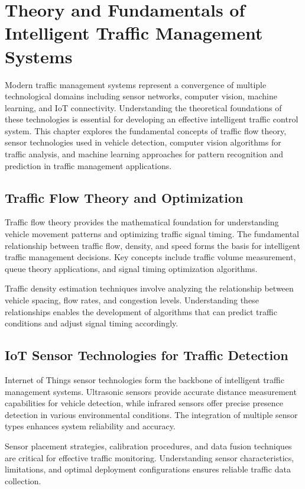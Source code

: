 \documentclass[12pt]{report}
\begin{document}
\chapter{Theory and Fundamentals of Intelligent Traffic Management Systems}
Modern traffic management systems represent a convergence of multiple technological domains including sensor networks, computer vision, machine learning, and IoT connectivity. Understanding the theoretical foundations of these technologies is essential for developing an effective intelligent traffic control system. This chapter explores the fundamental concepts of traffic flow theory, sensor technologies used in vehicle detection, computer vision algorithms for traffic analysis, and machine learning approaches for pattern recognition and prediction in traffic management applications.

\section{Traffic Flow Theory and Optimization}

Traffic flow theory provides the mathematical foundation for understanding vehicle movement patterns and optimizing traffic signal timing. The fundamental relationship between traffic flow, density, and speed forms the basis for intelligent traffic management decisions. Key concepts include traffic volume measurement, queue theory applications, and signal timing optimization algorithms.

Traffic density estimation techniques involve analyzing the relationship between vehicle spacing, flow rates, and congestion levels. Understanding these relationships enables the development of algorithms that can predict traffic conditions and adjust signal timing accordingly.

\section{IoT Sensor Technologies for Traffic Detection}

Internet of Things sensor technologies form the backbone of intelligent traffic management systems. Ultrasonic sensors provide accurate distance measurement capabilities for vehicle detection, while infrared sensors offer precise presence detection in various environmental conditions. The integration of multiple sensor types enhances system reliability and accuracy.

Sensor placement strategies, calibration procedures, and data fusion techniques are critical for effective traffic monitoring. Understanding sensor characteristics, limitations, and optimal deployment configurations ensures reliable traffic data collection.
\end{document}
